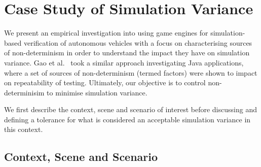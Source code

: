 \documentclass[letterpaper, 10 pt, journal, twoside]{IEEEtran}
\begin{document}
\section{Case Study of Simulation Variance} \label{s:case-study}

We present an empirical investigation into using game engines for
simulation-based verification of autonomous vehicles with a focus on
characterising sources of non-determinism in order to understand  the impact
they have on simulation variance. 
%
%
Gao et al.~\cite{when-and-what-should-we-control} took a similar approach investigating Java applications, where a set of sources of non-determinism (termed factors) were shown to impact on repeatability of testing. %
%
Ultimately, our objective is to control non-determinisim to minimise simulation variance.

%
We first describe the context, scene and scenario of interest before discussing and defining a tolerance for what is considered an acceptable simulation variance in this context.
%
%


\subsection{Context, Scene and Scenario}\label{TestsDescriptionAndTechnicalities}
\end{document}
